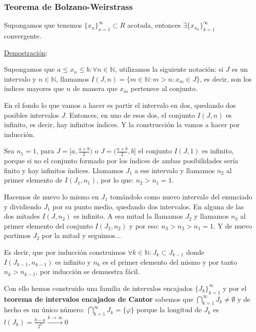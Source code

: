 \documentclass[10pt,a4paper,openright]{book}
\begin{document}
\subsubsection*{Teorema de Bolzano-Weirstrass}
Supongamos que tenemos $\{x_n\}_{n=1}^\infty\subset R$ acotada, entonces $\exists \{x_{n_k}\}_{k=1}^\infty$ convergente.\par
\underline{Demostración}:\par
Supongamos que $a\leq x_n\leq b: \forall n\in \mathbb N$, utilizamos la siguiente notación: si $J$ es un intervalo y $n\in \mathbb N$, llamamos $I(J,n)=\{m\in \mathbb N :m>n: x_m\in J\}$, es decir, son los índices mayores que $n$ de manera que $x_m$ pertenece al conjunto.\par

En el fondo lo que vamos a hacer es partir el intervalo en dos, quedando dos posibles intervalos $J$. Entonces, en uno de esos dos, el conjunto $I(J,n)$ es infinito, es decir, hay infinitos índices. Y la construcción la vamos a hacer por inducción.

Sea $n_1=1$, para $J=[a, \frac{a+b}{2})$ o $J=(\frac{a+b}{2},b]$ el conjunto $I(J,1)$ es infinito, porque si no el conjunto formado por los índices de ambas posibilidades sería finito y hay infinitos índices. Llamamos $J_1$ a ese intervalo y llamamos $n_2$ al primer elemento de $I(J_1,n_1)$, por lo que: $n_2>n_1=1$.\par

Hacemos de nuevo lo mismo en $J_1$ tomándolo como nuevo intervalo del enunciado y dividiendo $J_1$ por su punto medio, quedando dos intervalos. En alguna de las dos mitades $I(J, n_2)$ es infinito. A esa mitad la llamamos $J_2$ y llamamos $n_3$ al primer elemento del conjunto $I(J_2,n_2)$ y por eso: $n_3>n_2>n_1=1$. Y de nuevo partimos $J_2$ por la mitad y seguimos...\par

Es decir, que por inducción construimos $\forall k\in \mathbb N: J_k\subset J_{k-1}$ donde $I(J_{k-1},n_{k-1})$ es infinito y $n_{k}$ es el primer elemento del mismo y por tanto $n_k>n_{k-1}$, por inducción se demuestra fácil.\par

Con ello hemos construido una familia de intervalos encajados $\{J_k\}_{k=1}^\infty$ y por el \textbf{teorema de intervalos encajados de Cantor} sabemos que $\bigcap_{k=1}^\infty J_k\neq \emptyset$ y de hecho es un único número: $\bigcap_{k=1}^\infty J_k=\{\varphi\}$ porque la longitud de $J_k$ es $l(J_k)=\frac{b-a}{2^k}\xrightarrow{k\rightarrow \infty} 0$\par
\end{document}
